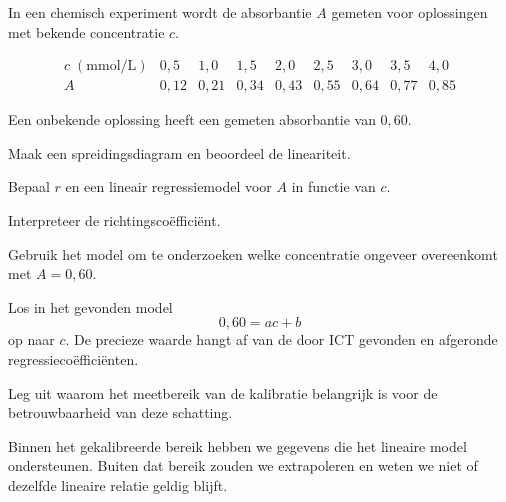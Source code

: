 \documentclass{ximera}
\begin{document}
\begin{oefening}{\oefU \ESS}

In een chemisch experiment wordt de absorbantie $A$ gemeten voor
oplossingen met bekende concentratie $c$.

\[
\begin{array}{c|rrrrrrrr}
c\;(\mathrm{mmol/L})&0{,}5&1{,}0&1{,}5&2{,}0&2{,}5&3{,}0&3{,}5&4{,}0\\ \hline
A&0{,}12&0{,}21&0{,}34&0{,}43&0{,}55&0{,}64&0{,}77&0{,}85
\end{array}
\]

Een onbekende oplossing heeft een gemeten absorbantie van $0{,}60$.

\begin{question}
Maak een spreidingsdiagram en beoordeel de lineariteit.
\end{question}

\begin{question}
Bepaal $r$ en een lineair regressiemodel voor $A$ in functie van $c$.
\end{question}

\begin{question}
Interpreteer de richtingscoëfficiënt.
\end{question}

\begin{question}
Gebruik het model om te onderzoeken welke concentratie ongeveer
overeenkomt met $A=0{,}60$.

\begin{oplossing}
Los in het gevonden model
\[
0{,}60=ac+b
\]
op naar $c$. De precieze waarde hangt af van de door ICT gevonden en
afgeronde regressiecoëfficiënten.
\end{oplossing}
\end{question}

\begin{question}
Leg uit waarom het meetbereik van de kalibratie belangrijk is voor de
betrouwbaarheid van deze schatting.

\begin{oplossing}
Binnen het gekalibreerde bereik hebben we gegevens die het lineaire
model ondersteunen. Buiten dat bereik zouden we extrapoleren en weten
we niet of dezelfde lineaire relatie geldig blijft.
\end{oplossing}
\end{question}
\end{oefening}
\end{document}
